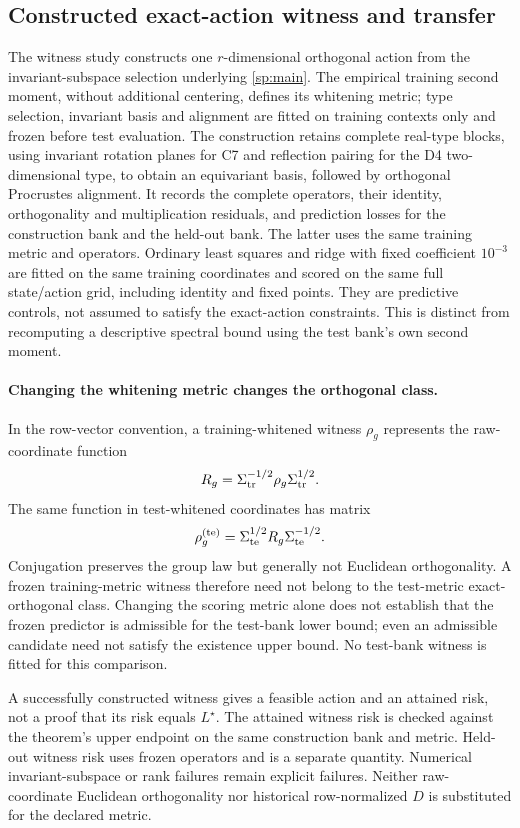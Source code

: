 \subsection{Constructed exact-action witness and transfer}
The witness study constructs one $r$-dimensional orthogonal action from the invariant-subspace selection underlying \cref{sp:main}. The empirical training second moment, without additional centering, defines its whitening metric; type selection, invariant basis and alignment are fitted on training contexts only and frozen before test evaluation. The construction retains complete real-type blocks, using invariant rotation planes for C7 and reflection pairing for the D4 two-dimensional type, to obtain an equivariant basis, followed by orthogonal Procrustes alignment. It records the complete operators, their identity, orthogonality and multiplication residuals, and prediction losses for the construction bank and the held-out bank. The latter uses the same training metric and operators. Ordinary least squares and ridge with fixed coefficient $10^{-3}$ are fitted on the same training coordinates and scored on the same full state/action grid, including identity and fixed points. They are predictive controls, not assumed to satisfy the exact-action constraints. This is distinct from recomputing a descriptive spectral bound using the test bank's own second moment.

\paragraph{Changing the whitening metric changes the orthogonal class.}
\label{app:metric-conjugation}
In the row-vector convention, a training-whitened witness $\rho_g$ represents the raw-coordinate function
\[
 R_g=\Sigma_{\rm tr}^{-1/2}\rho_g\Sigma_{\rm tr}^{1/2}.
\]
The same function in test-whitened coordinates has matrix
\[
 \rho_g^{(\rm te)}=\Sigma_{\rm te}^{1/2}R_g\Sigma_{\rm te}^{-1/2}.
\]
Conjugation preserves the group law but generally not Euclidean orthogonality. A frozen training-metric witness therefore need not belong to the test-metric exact-orthogonal class. Changing the scoring metric alone does not establish that the frozen predictor is admissible for the test-bank lower bound; even an admissible candidate need not satisfy the existence upper bound. No test-bank witness is fitted for this comparison.

A successfully constructed witness gives a feasible action and an attained risk, not a proof that its risk equals $L^\star$. The attained witness risk is checked against the theorem's upper endpoint on the same construction bank and metric. Held-out witness risk uses frozen operators and is a separate quantity. Numerical invariant-subspace or rank failures remain explicit failures. Neither raw-coordinate Euclidean orthogonality nor historical row-normalized $D$ is substituted for the declared metric.

